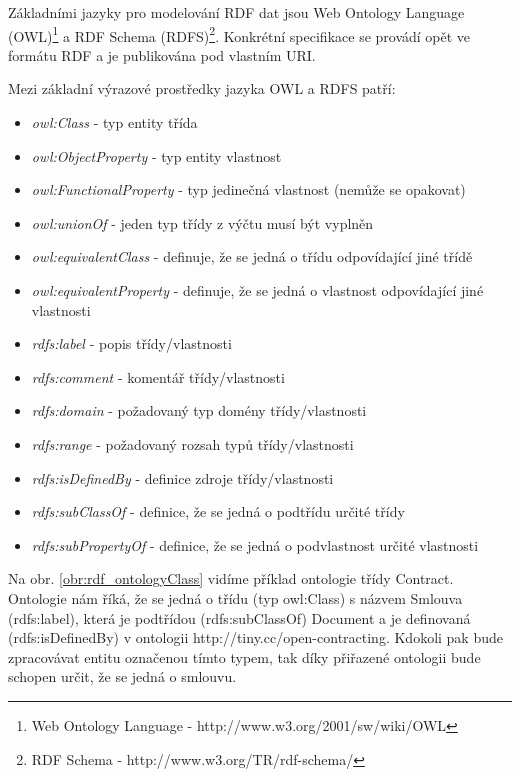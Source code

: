 Základními jazyky pro modelování RDF dat jsou Web Ontology Language (OWL)\footnote{Web Ontology Language - http://www.w3.org/2001/sw/wiki/OWL} a RDF Schema (RDFS)\footnote{RDF Schema - http://www.w3.org/TR/rdf-schema/}. Konkrétní specifikace se provádí opět ve formátu RDF a je publikována pod vlastním URI.

Mezi základní výrazové prostředky jazyka OWL a RDFS patří:

\begin{itemize}
\item \textit{owl:Class} - typ entity třída
\item \textit{owl:ObjectProperty} - typ entity vlastnost
\item \textit{owl:FunctionalProperty} - typ jedinečná vlastnost (nemůže se opakovat)
\item \textit{owl:unionOf} - jeden typ třídy z výčtu musí být vyplněn 
\item \textit{owl:equivalentClass} - definuje, že se jedná o třídu odpovídající jiné třídě
\item \textit{owl:equivalentProperty} - definuje, že se jedná o vlastnost odpovídající jiné vlastnosti
\item \textit{rdfs:label} - popis třídy/vlastnosti
\item \textit{rdfs:comment} - komentář třídy/vlastnosti
\item \textit{rdfs:domain} - požadovaný  typ domény třídy/vlastnosti
\item \textit{rdfs:range} - požadovaný rozsah typů třídy/vlastnosti
\item \textit{rdfs:isDefinedBy} - definice zdroje třídy/vlastnosti
\item \textit{rdfs:subClassOf} - definice, že se jedná o podtřídu určité třídy  
\item \textit{rdfs:subPropertyOf} - definice, že se jedná o podvlastnost určité vlastnosti  
\end{itemize}

Na obr. \ref{obr:rdf_ontologyClass} vidíme příklad ontologie třídy Contract. Ontologie nám říká, že se jedná o třídu (typ owl:Class) s názvem Smlouva (rdfs:label), která je podtřídou (rdfs:subClassOf) Document a je definovaná (rdfs:isDefinedBy) v ontologii http://tiny.cc/open-contracting. Kdokoli pak bude zpracovávat entitu označenou tímto typem, tak díky přiřazené ontologii bude schopen určit, že se jedná o smlouvu.

